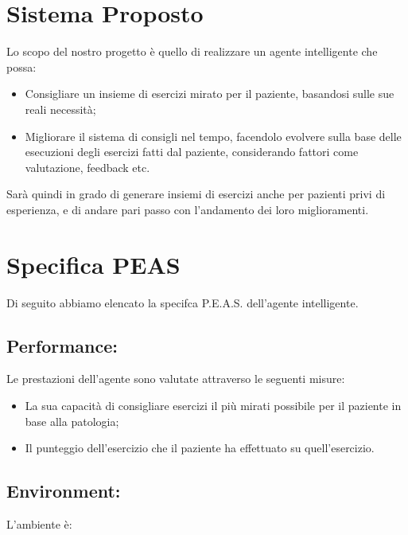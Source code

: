 \documentclass{article}
\begin{document}
    \section{Sistema Proposto}

    Lo scopo del nostro progetto è quello di realizzare un agente intelligente che possa:

    \begin{itemize}
        \item Consigliare un insieme di esercizi mirato per il paziente, basandosi sulle sue reali necessità;
        \item Migliorare il sistema di consigli nel tempo, facendolo evolvere sulla base delle esecuzioni degli esercizi fatti dal paziente, considerando fattori come valutazione, feedback etc.
    \end{itemize}

    Sarà quindi in grado di generare insiemi di esercizi anche per pazienti privi di esperienza, e di andare pari passo con l'andamento dei loro miglioramenti.

    \pagebreak

    \section{Specifica PEAS}

    Di seguito abbiamo elencato la specifca P.E.A.S. dell'agente intelligente.

    \subsection{Performance:}

    Le prestazioni dell’agente sono valutate attraverso le seguenti misure:

    \begin{itemize}
        \item La sua capacità di consigliare esercizi il più mirati possibile per il paziente in base alla patologia;
        \item Il punteggio dell'esercizio che il paziente ha effettuato su quell'esercizio.
    \end{itemize}

    \subsection{Environment:}

    L’ambiente è:
\end{document}
